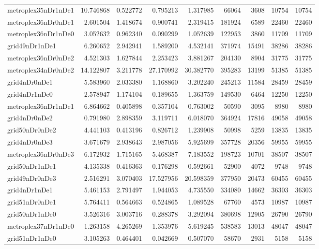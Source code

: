 \begin{longtable}{|l|r|r|r|r|r|r|r|r|}
metroplex35nDr1nDe1 & 10.746868 & 0.522772 & 0.795213 & 1.317985 & 66064 & 3608 & 10754 & 10754 \\
metroplex36nDr0nDe1 & 2.601504 & 1.418674 & 0.900741 & 2.319415 & 181924 & 6589 & 22460 & 22460 \\
metroplex36nDr1nDe0 & 3.052632 & 0.962340 & 0.090299 & 1.052639 & 122953 & 3860 & 11709 & 11709 \\
grid49nDr1nDe1 & 6.260652 & 2.942941 & 1.589200 & 4.532141 & 371974 & 15491 & 38286 & 38286 \\
metroplex36nDr0nDe2 & 4.521303 & 1.627844 & 2.253423 & 3.881267 & 204130 & 8904 & 31775 & 31775 \\
metroplex34nDr0nDe2 & 14.122807 & 3.211778 & 27.170992 & 30.382770 & 395283 & 13199 & 51385 & 51385 \\
grid4nDr0nDe1 & 5.583960 & 2.033380 & 1.168860 & 3.202240 & 245213 & 11584 & 28459 & 28459 \\
grid4nDr1nDe0 & 2.578947 & 1.174104 & 0.189655 & 1.363759 & 149530 & 6464 & 12250 & 12250 \\
metroplex36nDr1nDe1 & 6.864662 & 0.405898 & 0.357104 & 0.763002 & 50590 & 3095 & 8980 & 8980 \\
grid4nDr0nDe2 & 0.791980 & 2.898359 & 3.119711 & 6.018070 & 364924 & 17816 & 49058 & 49058 \\
grid50nDr0nDe2 & 4.441103 & 0.413196 & 0.826712 & 1.239908 & 50998 & 5259 & 13835 & 13835 \\
grid4nDr0nDe3 & 3.671679 & 2.938643 & 2.987056 & 5.925699 & 357728 & 20356 & 59955 & 59955 \\
metroplex36nDr0nDe3 & 6.172932 & 1.715165 & 5.468387 & 7.183552 & 198723 & 10701 & 38507 & 38507 \\
grid50nDr1nDe1 & 4.135338 & 0.416363 & 0.176298 & 0.592661 & 52900 & 4072 & 9748 & 9748 \\
grid49nDr0nDe3 & 2.516291 & 3.070403 & 17.527956 & 20.598359 & 377950 & 20473 & 60455 & 60455 \\
grid4nDr1nDe1 & 5.461153 & 2.791497 & 1.944053 & 4.735550 & 334080 & 14662 & 36303 & 36303 \\
grid51nDr0nDe1 & 5.764411 & 0.564663 & 0.524865 & 1.089528 & 67760 & 4573 & 10987 & 10987 \\
grid50nDr1nDe0 & 3.526316 & 3.003716 & 0.288378 & 3.292094 & 380698 & 12905 & 26790 & 26790 \\
metroplex37nDr1nDe0 & 1.263158 & 4.265269 & 1.353976 & 5.619245 & 538583 & 13013 & 48047 & 48047 \\
grid51nDr1nDe0 & 3.105263 & 0.464401 & 0.042669 & 0.507070 & 58670 & 2931 & 5158 & 5158 \\

\end{longtable}

